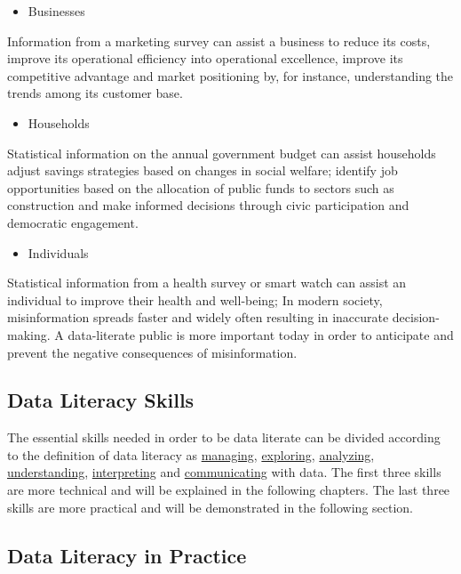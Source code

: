 \documentclass[
]{book}
\providecommand{\tightlist}{%
  \setlength{\itemsep}{0pt}\setlength{\parskip}{0pt}}
\begin{document}
\begin{itemize}
\tightlist
\item
  Businesses
\end{itemize}

Information from a marketing survey can assist a business to reduce its costs, improve its operational efficiency into operational excellence, improve its competitive advantage and market positioning by, for instance, understanding the trends among its customer base.

\begin{itemize}
\tightlist
\item
  Households
\end{itemize}

Statistical information on the annual government budget can assist households adjust savings strategies based on changes in social welfare; identify job opportunities based on the allocation of public funds to sectors such as construction and make informed decisions through civic participation and democratic engagement. ~

\begin{itemize}
\tightlist
\item
  Individuals
\end{itemize}

Statistical information from a health survey or smart watch can assist an individual to improve their health and well-being; In modern society, misinformation spreads faster and widely often resulting in inaccurate decision-making. A data-literate public is more important today in order to anticipate and prevent the negative consequences of misinformation.

\subsection{Data Literacy Skills}\label{data-literacy-skills}

The essential skills needed in order to be data literate can be divided according to the definition of data literacy as \ul{managing}, \ul{exploring}, \ul{analyzing}, \ul{understanding}, \ul{interpreting} and \ul{communicating} with data. The first three skills are more technical and will be explained in the following chapters. The last three skills are more practical and will be demonstrated in the following section.

\subsection{Data Literacy in Practice}\label{data-literacy-in-practice}
\end{document}
